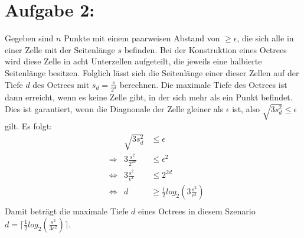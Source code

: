 \section*{Aufgabe 2: }
Gegeben sind $n$ Punkte mit einem paarweisen Abstand von $\geq \epsilon$, die sich alle in einer Zelle mit der Seitenlänge $s$ befinden. Bei der Konstruktion eines Octrees wird diese Zelle in acht Unterzellen aufgeteilt, die jeweils eine halbierte Seitenlänge besitzen. Folglich lässt sich die Seitenlänge einer dieser Zellen auf der Tiefe $d$ des Octrees mit $s_d = \frac{s}{2^d}$ berechnen. Die maximale Tiefe des Octrees ist dann erreicht, wenn es keine Zelle gibt, in der sich mehr als ein Punkt befindet. Dies ist garantiert, wenn die Diagnonale der Zelle gleiner als $\epsilon$ ist, also $\sqrt{3 s_d^2} \leq \epsilon$ gilt. Es folgt:
\begin{align*}
  && \sqrt{3 s_d^2} & \leq \epsilon\\
  &\Rightarrow & 3\frac{s^2}{2^{2d}} & \leq \epsilon^2\\
  &\Leftrightarrow & 3\frac{s^2}{\epsilon^2} & \leq 2^{2d}\\
  &\Leftrightarrow & d & \geq \frac{1}{2}log_2(3\frac{s^2}{\epsilon^2})\\
\end{align*}
Damit beträgt die maximale Tiefe $d$ eines Octrees in diesem Szenario $d = \lceil \frac{1}{2}log_2(\frac{s^2}{3\epsilon^2}) \rceil$.